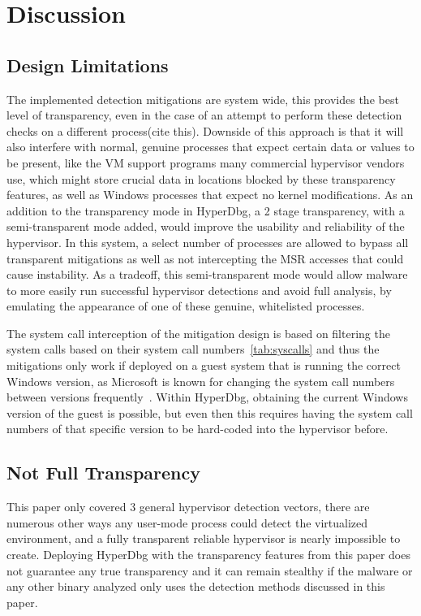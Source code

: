 \section{Discussion}\label{s:discussion}


\subsection{Design Limitations}
The implemented detection mitigations are system wide, this provides the best level of transparency, even in the case of an attempt 
to perform these detection checks on a different process(cite this). Downside of this approach is that it will also interfere with normal, 
genuine processes that expect certain data or values to be present, like the VM support programs many commercial hypervisor vendors use, 
which might store crucial data in locations blocked by these transparency features, as well as Windows processes that expect no kernel modifications. 
As an addition to the transparency mode in HyperDbg, a 2 stage transparency, with a semi-transparent mode added, would improve the usability and reliability of the hypervisor. 
In this system, a select number of processes are allowed to bypass all transparent mitigations as well as not intercepting the MSR accesses that could cause instability. 
As a tradeoff, this semi-transparent mode would allow malware to more easily run successful hypervisor detections and avoid full analysis, by emulating the appearance of one 
of these genuine, whitelisted processes.

The system call interception of the mitigation design is based on filtering the system calls based on their system call numbers~\ref{tab:syscalls} and thus the mitigations 
only work if deployed on a guest system that is running the correct Windows version, as Microsoft is known for changing the system call numbers between versions 
frequently~\cite{j00ruSyscalls}. Within HyperDbg, obtaining the current Windows version of the guest is possible, but even then this requires having the 
system call numbers of that specific version to be hard-coded into the hypervisor before.

\subsection{Not Full Transparency}
This paper only covered 3 general hypervisor detection vectors, there are numerous other ways any user-mode process could detect the virtualized environment, 
and a fully transparent reliable hypervisor is nearly impossible to create. Deploying HyperDbg with the transparency features from this paper does not guarantee any true 
transparency and it can remain stealthy if the malware or any other binary analyzed only uses the detection methods discussed in this paper.

